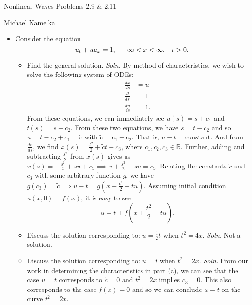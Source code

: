 \documentclass{article}
\begin{document}
\begin{center}
    {\huge Nonlinear Waves Problems 2.9 \& 2.11}
    \vspace{0.5cm}

    {\large Michael Nameika}
\end{center}

\begin{itemize}
    \item[2.9] Consider the equation
    \[u_t + uu_x = 1, \hspace{0.3cm} -\infty < x < \infty, \hspace{0.3cm} t > 0. \]
    \begin{itemize}
        \item[(a)] Find the general solution.
        \newline\newline
        \textit{Soln.} By method of characteristics, we wish to solve the following system of ODEs:
        \begin{align*}
            \frac{dx}{ds} &= u\\
            \frac{dt}{ds} &= 1\\
            \frac{du}{ds} &= 1.
        \end{align*}
        From these equations, we can immediately see $u(s) = s + c_1$ and $t(s) = s + c_2$. From these two equations, we have $s = t - c_2$ and so $u = t-c_2 + c_1 = \tilde{c}$ with $\tilde{c} = c_1 - c_2$. That is, $u - t = \text{constant}$. And from $\frac{dx}{ds}$, we find $x(s) = \frac{t^2}{2} + \tilde{c}t + c_3$, where $c_1,c_2,c_3 \in \mathbb{R}$. Further, adding and subtracting $\frac{s^2}{2}$ from $x(s)$ gives us $x(s) = -\frac{s^2}{2} + su + c_3 \implies x +\frac{s^2}{2}-su = c_3$. Relating the constants $\tilde{c}$ and $c_3$ with some arbitrary function $g$, we have $g(c_3) = \tilde{c} \implies u-t = g\left(x + \frac{t^2}{2}-tu \right).$ Assuming initial condition $u(x,0) = f(x)$, it is easy to see 
        \[u = t + f\left(x + \frac{t^2}{2}-tu\right).\]


        \item[(b)] Discuss the solution corresponding to: $u = \frac{1}{2}t$ when $t^2 = 4x$.
        \newline\newline
        \textit{Soln.} Not a solution.



        \item[(c)] Discuss the solution corresponding to: $u = t$ when $t^2 = 2x$.
        \newline\newline
        \textit{Soln.} From our work in determining the characteristics in part (a), we can see that the case $u = t$ corresponds to $\tilde{c} = 0$ and $t^2 = 2x$ implies $c_3 = 0$. This also corresponds to the case $f(x) = 0$ and so we can conclude $u = t$ on the curve $t^2 = 2x$.
    \end{itemize}



\end{itemize}
\end{document}
